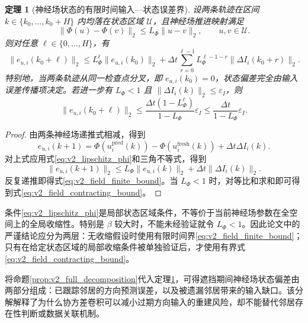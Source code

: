 \documentclass[UTF8,fontset=windows,11pt]{ctexart}
\theoremstyle{cnplain}
\newtheorem{theorem}{定理}[section]
\numberwithin{equation}{section}
\begin{document}
\begin{theorem}[神经场状态的有限时间输入—状态误差界]
\label{thm:v2_field_bound}
设两条轨迹在区间 $k\in\{k_0,\ldots,k_0+H\}$ 内均落在状态区域 $\mathcal U$，且神经场推进映射满足
\begin{equation}
 \|\Phi(u)-\Phi(v)\|_2\le L_\Phi\|u-v\|_2,
 \qquad u,v\in\mathcal U.
 \label{eq:v2_lipschitz_phi}
\end{equation}
则对任意 $\ell\in\{0,\ldots,H\}$，有
\begin{equation}
 \|e_{u,i}(k_0+\ell)\|_2
 \le L_\Phi^\ell\|e_{u,i}(k_0)\|_2
 +\Delta t\sum_{r=0}^{\ell-1}
 L_\Phi^{\ell-1-r}\|\Delta I_i(k_0+r)\|_2.
 \label{eq:v2_field_finite_bound}
\end{equation}
特别地，当两条轨迹从同一检查点分叉，即 $e_{u,i}(k_0)=0$，状态偏差完全由输入误差传播项决定。若进一步有 $L_\Phi<1$ 且 $\|\Delta I_i(k)\|_2\le\varepsilon_I$，则
\begin{equation}
 \|e_{u,i}(k_0+\ell)\|_2
 \le
 \frac{\Delta t(1-L_\Phi^\ell)}{1-L_\Phi}\varepsilon_I
 \le\frac{\Delta t}{1-L_\Phi}\varepsilon_I.
 \label{eq:v2_field_contracting_bound}
\end{equation}
\end{theorem}

\begin{proof}
由两条神经场递推式相减，得到
\begin{equation}
 e_{u,i}(k+1)=\Phi(u_i^{\mathrm{pred}}(k))-
 \Phi(u_i^{\mathrm{fresh}}(k))+\Delta t\Delta I_i(k).
 \end{equation}
对上式应用式\eqref{eq:v2_lipschitz_phi}和三角不等式，得到
\begin{equation}
 \|e_{u,i}(k+1)\|_2
 \le L_\Phi\|e_{u,i}(k)\|_2+\Delta t\|\Delta I_i(k)\|_2.
\end{equation}
反复递推即得式\eqref{eq:v2_field_finite_bound}。当 $L_\Phi<1$ 时，对等比和求和即可得到式\eqref{eq:v2_field_contracting_bound}。
\end{proof}

条件\eqref{eq:v2_lipschitz_phi}是局部状态区域条件，不等价于当前神经场参数在全空间上的全局收缩性。特别是 $\beta$ 较大时，不能未经验证就令 $L_\Phi<1$。因此论文中的严谨结论应分为两层：无收缩假设时使用有限时间界\eqref{eq:v2_field_finite_bound}；只有在给定状态区域的局部收缩条件被单独验证后，才使用有界式\eqref{eq:v2_field_contracting_bound}。

将命题\ref{prop:v2_full_decomposition}代入定理\ref{thm:v2_field_bound}，可得遮挡期间神经场状态偏差由两部分组成：已跟踪邻居的方向预测误差，以及被遗漏邻居带来的输入缺口。该分解解释了为什么协方差卷积可以减小过期方向输入的重建风险，却不能替代邻居存在性判断或数据关联机制。
\end{document}
